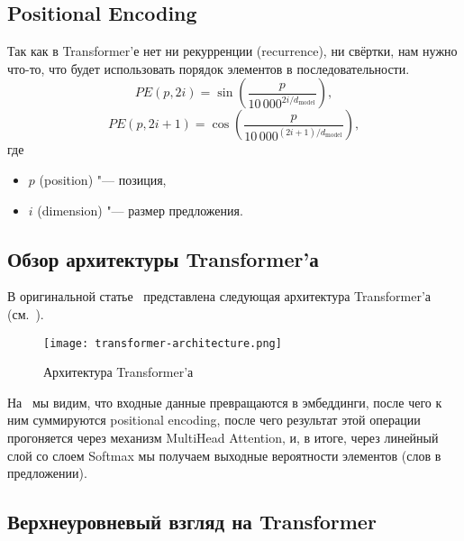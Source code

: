 \subsection{Positional Encoding}


Так как в Transformer'е нет ни рекурренции (recurrence), ни свёртки, нам нужно что-то, что будет использовать порядок элементов в последовательности.
\begin{equation}\label{positional-encoding}%
  PE(p, 2i) = \sin\left( \frac{p}{10\,000^{2i / d_{\text{model}}}} \right),
\end{equation}
\begin{equation}\label{positional-encoding-2}%
  PE(p, 2i + 1) = \cos\left( \frac{p}{10\,000^{(2i + 1) / d_{\text{model}}}} \right),
\end{equation}
где
\begin{itemize}%
  \item $p$ (position) "--- позиция,
  \item $i$ (dimension) "--- размер предложения.
\end{itemize}


\subsection{Обзор архитектуры Transformer'а}


В оригинальной статье~\cite{Transformer2019} представлена следующая архитектура Transformer'а (см.~).
\begin{figure}[H]%
  \centering
  \texttt{[image: transformer-architecture.png]}
  \caption{Архитектура Transformer'а}
  \label{transformer-architecture}
\end{figure}

На~ мы видим, что входные данные превращаются в эмбеддинги, после чего к ним суммируются positional encoding, после чего результат этой операции прогоняется через механизм MultiHead Attention, и, в итоге, через линейный слой со слоем Softmax мы получаем выходные вероятности элементов (слов в предложении).


\subsection{Верхнеуровневый взгляд на Transformer}



